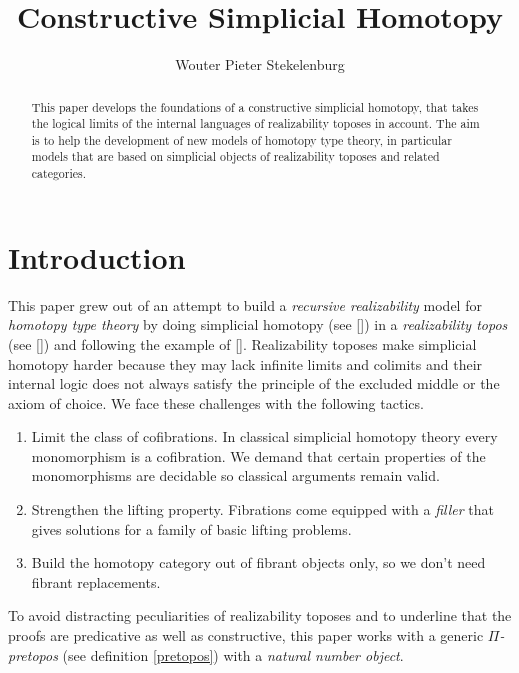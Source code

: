 \documentclass{tac}
\title{Constructive Simplicial Homotopy}
\author{Wouter Pieter Stekelenburg}
\newcommand\hide[1]{}
\newcommand\citep[1]{[\cite{#1}]}
\begin{document}
\begin{abstract} This paper develops the foundations of a constructive simplicial homotopy, that takes the logical limits of the internal languages of realizability toposes in account. The aim is to help the development of new models of homotopy type theory, in particular models that are based on simplicial objects of realizability toposes and related categories. \end{abstract}

\hide{
Three papers:
-simplicial homotopy
-complete categories [how they are preserved]
-the realizability model of HOTT [how to get a fibrant object out of a category]

Idea: reverse the order. definitions--theorem--lemmas. That way the purpose of the lemmas is set up from the start.
}

\maketitle

\section*{Introduction}
This paper grew out of an attempt to build a \emph{recursive realizability} model for \emph{homotopy type theory} by doing simplicial homotopy (see \citep{Hovey99,GJSHT}) in a \emph{realizability topos} (see \citep{MR2479466}) and following the example of \citep{KLV12}.
Realizability toposes make simplicial homotopy harder because they may lack infinite limits and colimits and their internal logic does not always satisfy the principle of the excluded middle or the axiom of choice. We face these challenges with the following tactics.
\begin{enumerate}
\item Limit the class of cofibrations. In classical simplicial homotopy theory every mono\-morphism is a cofibration. We demand that certain properties of the monomorphisms are decidable so classical arguments remain valid.
\item Strengthen the lifting property. Fibrations come equipped with a \emph{filler} that gives solutions for a family of basic lifting problems.
\item Build the homotopy category out of fibrant objects only, so we don't need fibrant replacements.
\end{enumerate}
To avoid distracting peculiarities of realizability toposes and to underline that the proofs are predicative as well as constructive, this paper works with a generic \emph{$\Pi$-pretopos} (see definition \ref{pretopos}) with a \emph{natural number object}.
\end{document}
